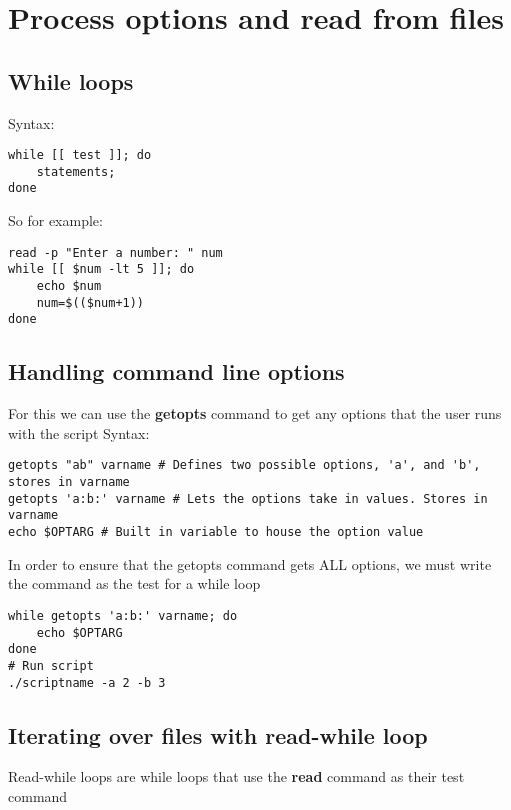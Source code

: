 \documentclass{report}
\begin{document}
    \pagebreak \bigbreak \noindent 
    \section{\LARGE Process options and read from files}
    \bigbreak \noindent 
    \subsection{While loops}
    \bigbreak \noindent 
    Syntax:
    
    \begin{verbatim}
while [[ test ]]; do
    statements;
done
    \end{verbatim}
    \bigbreak \noindent
    
    \bigbreak \noindent 
    So for example:
    
    \begin{verbatim}
read -p "Enter a number: " num
while [[ $num -lt 5 ]]; do
    echo $num
    num=$(($num+1))
done
    \end{verbatim}
    \bigbreak \noindent
    


    \bigbreak \noindent 
    \subsection{Handling command line options}
    \bigbreak \noindent 
    For this we can use the \textbf{getopts} command to get any options that the user runs with the script
    \bigbreak \noindent 
    Syntax:
    
    \begin{verbatim}
getopts "ab" varname # Defines two possible options, 'a', and 'b', stores in varname
getopts 'a:b:' varname # Lets the options take in values. Stores in varname
echo $OPTARG # Built in variable to house the option value
    \end{verbatim}
    \bigbreak \noindent
    
    \bigbreak \noindent 
    In order to ensure that the getopts command gets ALL options, we must write the command as the test for a while loop
    
    \begin{verbatim}
while getopts 'a:b:' varname; do 
    echo $OPTARG
done
# Run script
./scriptname -a 2 -b 3
    \end{verbatim}
    \bigbreak \noindent
    

    \pagebreak \bigbreak \noindent 
    \subsection{Iterating over files with read-while loop}
    \bigbreak \noindent 
    \begin{concept}
        Read-while loops are while loops that use the \textbf{read} command as their test command
    \end{concept}
    
\end{document}
